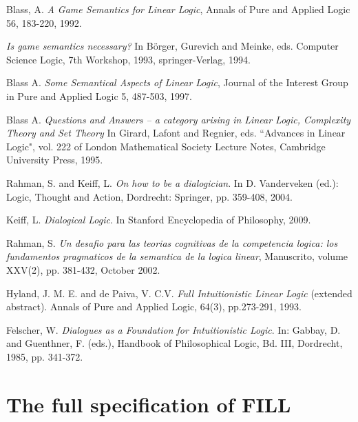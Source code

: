 \documentclass{article}
\begin{document}
 \begin{thebibliography}{000}


 Blass, A. {\it A Game Semantics for Linear Logic}, Annals of Pure and 
Applied Logic 56, 183-220, 1992. 

 {\it Is game semantics necessary?} In B\"orger, Gurevich and Meinke, eds. Computer Science Logic, 7th Workshop, 1993, springer-Verlag, 1994.

 Blass A. {\it Some Semantical Aspects of Linear Logic}, Journal of the 
Interest Group in Pure and Applied Logic 5, 487-503, 1997.

  Blass A. {\it Questions and Answers -- a category arising in Linear Logic, Complexity Theory and Set Theory} In Girard, Lafont and Regnier,  eds. ``Advances in Linear Logic", vol. 222 of London Mathematical Society Lecture Notes, Cambridge University Press, 1995.

 Rahman, S. and Keiff, L. {\it On how to be a dialogician}. In D. Vanderveken (ed.): Logic, Thought and Action, Dordrecht: Springer, pp. 359-408, 2004.

 Keiff, L. {\it Dialogical Logic}. In Stanford Encyclopedia of Philosophy, 2009.

 Rahman, S. {\it Un desafio para las  teorias cognitivas de la competencia logica: los fundamentos pragmaticos de la semantica de la logica linear}, Manuscrito, volume XXV(2), pp. 381-432, October 2002. 

 Hyland, J. M. E. and de Paiva, V. C.V. {\it Full Intuitionistic Linear Logic} (extended abstract). Annals of Pure and Applied Logic, 64(3), pp.273-291, 1993.

Felscher, W. {\it Dialogues as a Foundation for Intuitionistic 
Logic}. In: Gabbay, D. and  Guenthner, F. (eds.), Handbook of 
Philosophical Logic, Bd. III, Dordrecht, 1985, pp. 341-372. 

\end{thebibliography}

\appendix

\section{The full specification of FILL}
\label{sec:fill_specification}
\FILLall{}
\end{document}
